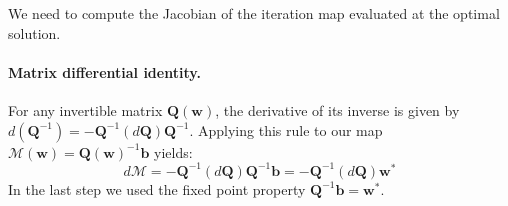 We need to compute the Jacobian of the iteration map evaluated at the optimal solution.

\paragraph{Matrix differential identity.}
For any invertible matrix $\mathbf{Q}(\mathbf{w})$, the derivative of its inverse is given by $d(\mathbf{Q}^{-1}) = -\mathbf{Q}^{-1}(d\mathbf{Q})\mathbf{Q}^{-1}$.
Applying this rule to our map $\mathcal{M}(\mathbf{w})=\mathbf{Q}(\mathbf{w})^{-1}\mathbf{b}$ yields:
\begin{equation}
    d\mathcal{M}
    = -\mathbf{Q}^{-1}(d\mathbf{Q})\mathbf{Q}^{-1}\mathbf{b}
    = -\mathbf{Q}^{-1}(d\mathbf{Q})\mathbf{w}^*
    \label{app:eq:dM}
\end{equation}
In the last step we used the fixed point property $\mathbf{Q}^{-1}\mathbf{b}=\mathbf{w}^*$.

